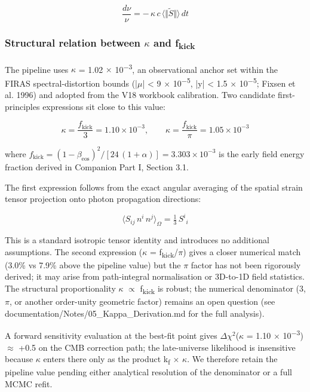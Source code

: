 \documentclass[11pt,a4paper]{article}
\begin{document}
$$
\frac{d\nu}{\nu} = -\,\kappa\,c\,\langle \Vert \tilde{S}\Vert\rangle\,dt
$$

\subsubsection{Structural relation between $\kappa$ and f\textsubscript{kick}}
The pipeline uses $\kappa$ = 1.02 $\times$ 10\textsuperscript{$-$3}, an observational anchor set within the FIRAS spectral-distortion bounds (|$\mu$| < 9 $\times$ 10\textsuperscript{$-$5}, |y| < 1.5 $\times$ 10\textsuperscript{$-$5}; Fixsen et al. 1996) and adopted from the V18 workbook calibration. Two candidate first-principles expressions sit close to this value:

$$
\kappa = \frac{f_{\mathrm{kick}}}{3} = 1.10 \times 10^{-3}, \qquad \kappa = \frac{f_{\mathrm{kick}}}{\pi} = 1.05 \times 10^{-3}
$$

where \(f_{\mathrm{kick}} = (1-\beta_{\mathrm{eos}})^2 / [24\,(1+\alpha)] = 3.303 \times 10^{-3}\) is the early field energy fraction derived in Companion Part I, Section 3.1.

The first expression follows from the exact angular averaging of the spatial strain tensor projection onto photon propagation directions:

$$
\langle S_{ij}\,n^i\,n^j \rangle_{\Omega} = \tfrac{1}{3}\,S^i{}_i
$$

This is a standard isotropic tensor identity and introduces no additional assumptions. The second expression ($\kappa$ = f\textsubscript{kick}/$\pi$) gives a closer numerical match (3.0\% vs 7.9\% above the pipeline value) but the $\pi$ factor has not been rigorously derived; it may arise from path-integral normalisation or 3D-to-1D field statistics. The structural proportionality $\kappa$ $\propto$ f\textsubscript{kick} is robust; the numerical denominator (3, $\pi$, or another order-unity geometric factor) remains an open question (see documentation/\allowbreak{}Notes/\allowbreak{}05\_\allowbreak{}Kappa\_\allowbreak{}Derivation.md for the full analysis).

A forward sensitivity evaluation at the best-fit point gives $\Delta$$\chi$$^{2}$($\kappa$ = 1.10 $\times$ 10\textsuperscript{$-$3}) $\approx$ +0.5 on the CMB correction path; the late-universe likelihood is insensitive because $\kappa$ enters there only as the product k\textsubscript{f} $\times$ $\kappa$. We therefore retain the pipeline value pending either analytical resolution of the denominator or a full MCMC refit.
\end{document}
